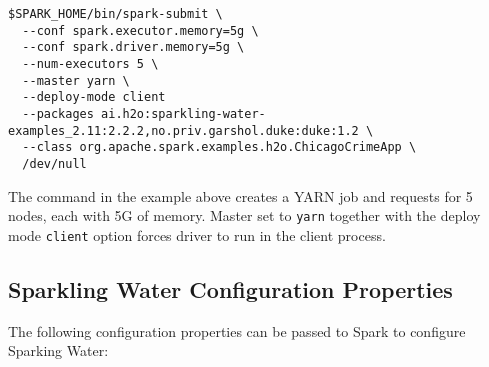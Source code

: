 \begin{lstlisting}[style=Bash]
$SPARK_HOME/bin/spark-submit \ 
  --conf spark.executor.memory=5g \
  --conf spark.driver.memory=5g \
  --num-executors 5 \
  --master yarn \
  --deploy-mode client
  --packages ai.h2o:sparkling-water-examples_2.11:2.2.2,no.priv.garshol.duke:duke:1.2 \
  --class org.apache.spark.examples.h2o.ChicagoCrimeApp \
  /dev/null
\end{lstlisting}

The command in the example above creates a YARN job and requests for 5 nodes, each with 5G of memory. Master set to \texttt{yarn} together with the deploy mode \texttt{client} option forces driver to run in the client process.

\newpage

\subsection{Sparkling Water Configuration Properties}
\label{sec:properties}
The following configuration properties can be passed to Spark to configure Sparking Water:

